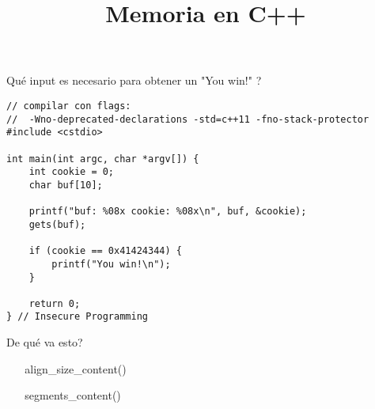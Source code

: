 

\title%
{Memoria en C++}

\subject{Memoria en C++}



\begin{frame}
   \titlepage
\end{frame}

\begin{frame}[fragile]{Qu\'e input es necesario para obtener un "You win!" ?}
         \begin{lstlisting}[style=normal]
// compilar con flags:
//  -Wno-deprecated-declarations -std=c++11 -fno-stack-protector
#include <cstdio>

int main(int argc, char *argv[]) {
    int cookie = 0;
    char buf[10];

    printf("buf: %08x cookie: %08x\n", buf, &cookie);
    gets(buf);

    if (cookie == 0x41424344) {
        printf("You win!\n");
    }

    return 0;
} // Insecure Programming
         \end{lstlisting}
\end{frame}

\begin{frame}{De qu\'e va esto?}
   \tableofcontents
\end{frame}

~%
~{ align_size_content() }~


~%
~{ segments_content() }~


